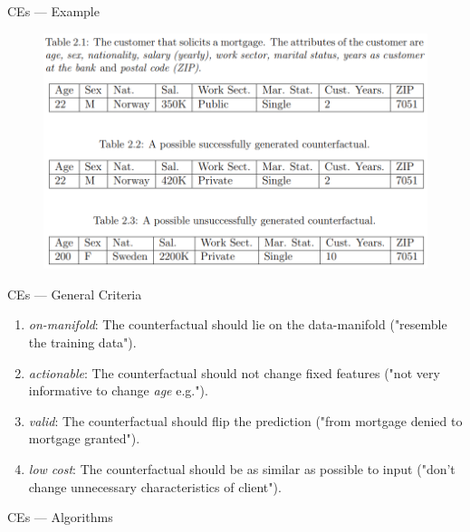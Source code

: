 \documentclass[aspectratio=169]{beamer}
\begin{document}
    \begin{frame}[fragile]{CEs — Example}
        \begin{figure}
            \centering
            \includegraphics[scale = 0.39]{master_presentation/figures/counterfact_example.png}
            \label{fig:counterfactualExample}
        \end{figure}
    \end{frame}

    \begin{frame}{CEs — General Criteria}
        \begin{enumerate}
            \item \textit{on-manifold}: The counterfactual should lie on the data-manifold ("resemble the training data").
            \item \textit{actionable}: The counterfactual should not change fixed features ("not very informative to change \textit{age} e.g.").
            \item \textit{valid}: The counterfactual should flip the prediction ("from mortgage denied to mortgage granted").
            \item \textit{low cost}: The counterfactual should be as similar as possible to input ("don't change unnecessary characteristics of client").
        \end{enumerate}
    \end{frame} 

    \begin{frame}[fragile]{CEs — Algorithms}
     
    \end{frame}
\end{document}

